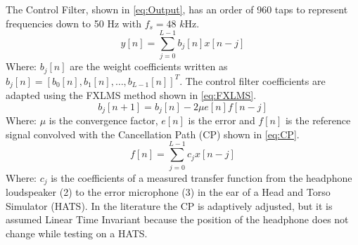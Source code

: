 The Control Filter, shown in \autoref{eq:Output}, has an order of 960 taps to represent frequencies down to 50 Hz with $f_s = 48$ $k$Hz. 
\begin{equation}\label{eq:Output}
y[n]=\sum_{j=0}^{L-1}b_j[n]x[n-j]
\end{equation}
Where: $b_j[n]$ are the weight coefficients written as  $b_j[n]=[b_0[n],b_1[n], \dotsc, b_{L-1}[n]]^T$. The control filter coefficients are adapted using the FXLMS method shown in \autoref{eq:FXLMS}.
\begin{equation}\label{eq:FXLMS}
b_j[n+1] = b_j[n] - 2\mu e[n]f[n-j]
\end{equation}
Where: $\mu$ is the convergence factor, $e[n]$ is the error and $f[n]$ is the reference signal convolved with the Cancellation Path (CP) shown in \autoref{eq:CP}.
\begin{equation}\label{eq:CP}
f[n]=\sum_{j=0}^{L-1}c_jx[n-j]
\end{equation}
Where: $c_j$ is the coefficients of a measured transfer function from the headphone loudspeaker (2) to the error microphone (3) in the ear of a Head and Torso Simulator (HATS). In the literature \cite{Hansen} the CP is adaptively adjusted, but it is assumed Linear Time Invariant because the position of the headphone does not change while testing on a HATS. 


